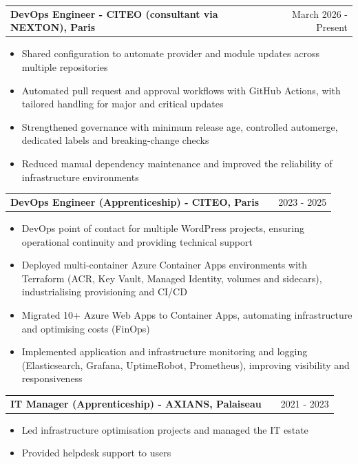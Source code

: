 \documentclass[a4paper,10pt]{article}
\makeatletter
\newenvironment{joblong}[2]
    {
    \begin{tabularx}{\linewidth}{@{}l X r@{}}
    \textbf{#1} & \hfill &  #2 \\[2pt]
    \end{tabularx}
    \begin{minipage}[t]{\linewidth}
    \begin{itemize}[after=\strut, leftmargin=1em, itemsep=3pt,label=--]
    }
    {
    \end{itemize}
    \end{minipage}
    }
\makeatother
\begin{document}
\begin{joblong}{DevOps Engineer - CITEO (consultant via NEXTON), Paris}{March 2026 - Present}
\begin{itemize}[nosep, leftmargin=1em, itemsep=0pt, label=\textbullet]
\item Shared configuration to automate provider and module updates across multiple repositories
\item Automated pull request and approval workflows with GitHub Actions, with tailored handling for major and critical updates
\item Strengthened governance with minimum release age, controlled automerge, dedicated labels and breaking-change checks
\item Reduced manual dependency maintenance and improved the reliability of infrastructure environments
\end{itemize}
\end{joblong}

\vspace{2pt}

\begin{joblong}{DevOps Engineer (Apprenticeship) - CITEO, Paris}{2023 - 2025}
\item DevOps point of contact for multiple WordPress projects, ensuring operational continuity and providing technical support
\item Deployed multi-container Azure Container Apps environments with Terraform (ACR, Key Vault, Managed Identity, volumes and sidecars), industrialising provisioning and CI/CD
\item Migrated 10+ Azure Web Apps to Container Apps, automating infrastructure and optimising costs (FinOps)
\item Implemented application and infrastructure monitoring and logging (Elasticsearch, Grafana, UptimeRobot, Prometheus), improving visibility and responsiveness
\end{joblong}

\vspace{2pt}

\begin{joblong}{IT Manager (Apprenticeship) - AXIANS, Palaiseau}{2021 - 2023}
\item Led infrastructure optimisation projects and managed the IT estate
\item Provided helpdesk support to users
\end{joblong}

\vspace{3pt}

\end{document}
